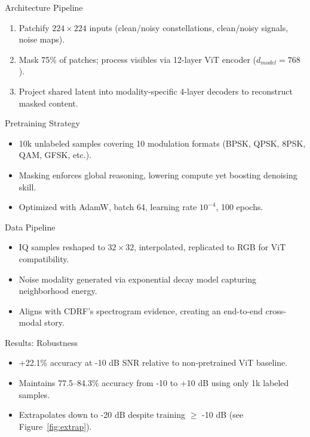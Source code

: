 \begin{frame}{Architecture Pipeline}
    \begin{enumerate}
        \item Patchify $224\times224$ inputs (clean/noisy constellations, clean/noisy signals, noise maps).
        \item Mask 75\% of patches; process visibles via 12-layer ViT encoder ($d_{model}=768$).
        \item Project shared latent into modality-specific 4-layer decoders to reconstruct masked content.
    \end{enumerate}
\end{frame}

\begin{frame}{Pretraining Strategy}
    \begin{itemize}
        \item 10k unlabeled samples covering 10 modulation formats (BPSK, QPSK, 8PSK, QAM, GFSK, etc.).
        \item Masking enforces global reasoning, lowering compute yet boosting denoising skill.
        \item Optimized with AdamW, batch 64, learning rate $10^{-4}$, 100 epochs.
    \end{itemize}
\end{frame}

\begin{frame}{Data Pipeline}
    \begin{itemize}
        \item IQ samples reshaped to $32\times32$, interpolated, replicated to RGB for ViT compatibility.
        \item Noise modality generated via exponential decay model capturing neighborhood energy.
        \item Aligns with CDRF’s spectrogram evidence, creating an end-to-end cross-modal story.
    \end{itemize}
\end{frame}

\begin{frame}{Results: Robustness}
    \begin{itemize}
        \item +22.1\% accuracy at -10 dB SNR relative to non-pretrained ViT baseline.
        \item Maintains 77.5–84.3\% accuracy from -10 to +10 dB using only 1k labeled samples.
        \item Extrapolates down to -20 dB despite training $\geq$ -10 dB (see Figure~\ref{fig:extrap}).
    \end{itemize}
\end{frame}

